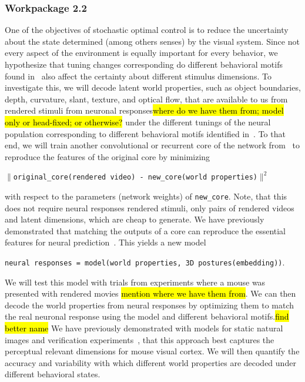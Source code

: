 \documentclass[B2,COG]{ercgrant}
\begin{document}
\subsubsection{Workpackage 2.2\hfill {}}
One of the objectives of stochastic optimal control is to reduce the uncertainty about the state determined (among others senses) by the visual system. 
Since not every aspect of the environment is equally important for every behavior, we hypothesize that tuning changes corresponding do different behavioral motifs found in~ also affect the certainty about different stimulus dimensions. 
To investigate this, we will decode latent world properties, such as object boundaries, depth, curvature, slant, texture, and optical flow, that are available to us from rendered stimuli from neuronal responses\hl{where do we have them from; model only or head-fixed; or otherwise?} under the different tunings of the neural population corresponding to different behavioral motifs identified in~.
To that end, we will train another convolutional or recurrent core of the network from~ to reproduce the features of the original core by minimizing
\begin{center}
    \texttt{$\|$original\_core(rendered video) - new\_core(world properties)$\|^2$}
\end{center}
with respect to the parameters (network weights) of \texttt{new\_core}. 
Note, that this does not require neural responses rendered stimuli, only pairs of rendered videos and latent dimensions, which are cheap to generate. 
We have previously demonstrated that matching the outputs of a core can reproduce the essential features for neural prediction~\parencite{Safarani2021-yy}.
This yields a new model 
\begin{center}
    \texttt{neural responses = model(world properties, 3D postures(embedding))}.
\end{center}
We will test this model with trials from experiments where a mouse was presented with rendered movies \hl{mention where we have them from}. 
We can then decode the world properties from neural responses by optimizing them to match the real neuronal response using the model and different behavioral motifs.\hl{find better name} 
We have previously demonstrated with models for static natural images and verification experiments~\parencite{Cobos2022-rr}, that this approach best captures the perceptual relevant dimensions for mouse visual cortex. 
We will then quantify the accuracy and variability with which different world properties are decoded under different behavioral states. 
\end{document}
